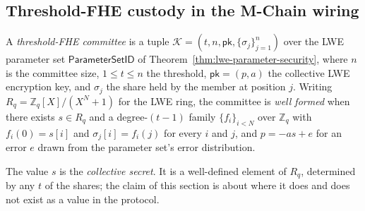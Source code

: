 
\subsection*{Threshold-FHE custody in the M-Chain wiring}

\begin{definition}
\label{def:tfhe-committee}
A \emph{threshold-FHE committee} is a tuple
$\mathcal{K} = (t, n, \mathsf{pk}, \{\sigma_j\}_{j=1}^{n})$ over the LWE
parameter set $\mathsf{ParameterSetID}$ of
Theorem~\ref{thm:lwe-parameter-security}, where $n$ is the committee size,
$1 \le t \le n$ the threshold, $\mathsf{pk} = (p, a)$ the collective LWE
encryption key, and $\sigma_j$ the share held by the member at position $j$.
Writing $R_q = \mathbb{Z}_q[X]/(X^N+1)$ for the LWE ring, the committee is
\emph{well formed} when there exists $s \in R_q$ and a degree-$(t-1)$ family
$\{f_i\}_{i<N}$ over $\mathbb{Z}_q$ with $f_i(0) = s[i]$ and
$\sigma_j[i] = f_i(j)$ for every $i$ and $j$, and $p = -a s + e$ for an error
$e$ drawn from the parameter set's error distribution.

The value $s$ is the \emph{collective secret}. It is a well-defined element of
$R_q$, determined by any $t$ of the shares; the claim of this section is about
where it does and does not exist as a value in the protocol.
\end{definition}


